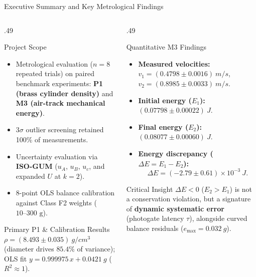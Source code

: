 \documentclass[aspectratio=169,10pt]{beamer}
\newcommand{\sm}{\fontsize{8.2}{10.2}\selectfont}
\newcommand{\uc}{u_{c}}
\newcommand{\uA}{u_{A}}
\newcommand{\uB}{u_{B}}
\begin{document}
\begin{frame}{Executive Summary and Key Metrological Findings}
\begin{columns}[T,onlytextwidth]
\begin{column}{.49\textwidth}
\begin{block}{Project Scope}\sm
\begin{itemize}
\item Metrological evaluation ($n=8$ repeated trials) on paired benchmark experiments: \textbf{P1 (brass cylinder density)} and \textbf{M3 (air-track mechanical energy)}.
\item $3\sigma$ outlier screening retained 100\% of measurements.
\item Uncertainty evaluation via \textbf{ISO-GUM} ($\uA$, $\uB$, $\uc$, and expanded $U$ at $k=2$).
\item 8-point OLS balance calibration against Class F2 weights ($10\text{--}300\text{ g}$).
\end{itemize}
\end{block}
\begin{exampleblock}{Primary P1 \& Calibration Results}\sm
$\rho = (8.493 \pm 0.035)\ \si{g/cm^3}$ (diameter drives $85.4\%$ of variance); OLS fit $y = 0.999975\,x + 0.0421\ \si{g}$ ($R^2 \approx 1$).
\end{exampleblock}
\end{column}

\begin{column}{.49\textwidth}
\begin{block}{Quantitative M3 Findings}\sm
\begin{itemize}
\item \textbf{Measured velocities:} $v_1 = (0.4798 \pm 0.0016)\ \si{m/s}$, $v_2 = (0.8985 \pm 0.0033)\ \si{m/s}$.
\item \textbf{Initial energy ($E_1$):} $(0.07798 \pm 0.00022)\ \si{J}$.
\item \textbf{Final energy ($E_2$):} $(0.08077 \pm 0.00060)\ \si{J}$.
\item \textbf{Energy discrepancy ($\Delta E = E_1 - E_2$):}
  $$\Delta E = (-2.79 \pm 0.61) \times 10^{-3}\ \si{J}.$$
\end{itemize}
\end{block}
\begin{alertblock}{Critical Insight}\sm
$\Delta E < 0$ ($E_2 > E_1$) is not a conservation violation, but a signature of \textbf{dynamic systematic error} (photogate latency $\tau$), alongside curved balance residuals ($e_{\max} = 0.032\ \si{g}$).
\end{alertblock}
\end{column}
\end{columns}
\end{frame}
\end{document}
